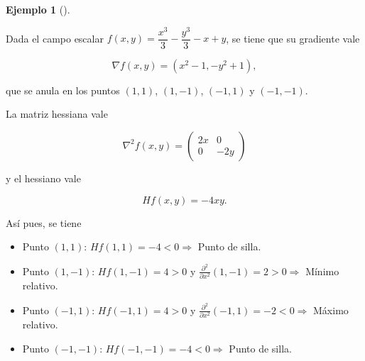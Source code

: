 \documentclass[
  a4paper,
]{scrreport}
\providecommand{\tightlist}{%
  \setlength{\itemsep}{0pt}\setlength{\parskip}{0pt}}\usepackage{longtable,booktabs,array}
\theoremstyle{plain}
\theoremstyle{plain}
\theoremstyle{definition}
\theoremstyle{definition}
\newtheorem{example}{Ejemplo}[chapter]
\theoremstyle{plain}
\theoremstyle{definition}
\theoremstyle{remark}
\begin{document}
\begin{example}[]\protect\hypertarget{exm-extremos-relativos-2}{}\label{exm-extremos-relativos-2}

Dada el campo escalar \(f(x,y)=\dfrac{x^3}{3}-\dfrac{y^3}{3}-x+y\), se
tiene que su gradiente vale

\[\nabla f(x,y)= (x^2-1,-y^2+1),\]

que se anula en los puntos \((1,1)\), \((1,-1)\), \((-1,1)\) y
\((-1,-1)\).

La matriz hessiana vale

\[\nabla^2f(x,y) = \left(
\begin{array}{cc}
2x & 0\\
0 & -2y
\end{array}
\right)\]

y el hessiano vale

\[Hf(x,y) = -4xy.\]

Así pues, se tiene

\begin{itemize}
\tightlist
\item
  Punto \((1,1)\): \(Hf(1,1)=-4<0 \Rightarrow\) Punto de silla.
\item
  Punto \((1,-1)\): \(Hf(1,-1)=4>0\) y
  \(\frac{\partial^2}{\partial x^2}(1,-1)=2>0 \Rightarrow\) Mínimo
  relativo.
\item
  Punto \((-1,1)\): \(Hf(-1,1)=4>0\) y
  \(\frac{\partial^2}{\partial x^2}(-1,1)=-2<0 \Rightarrow\) Máximo
  relativo.
\item
  Punto \((-1,-1)\): \(Hf(-1,-1)=-4<0 \Rightarrow\) Punto de silla.
\end{itemize}

\end{example}
\end{document}
